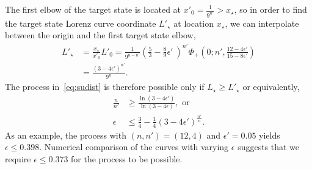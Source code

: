 \documentclass[pra,
aps,
twocolumn,
superscriptaddress,
groupedaddress,
nofootinbib,
reprint
]{revtex4-1}
\begin{document}
The first elbow of the target state is located at $x'_0 = \frac{1}{9^{n'}} > x_\star$, so in order to find the target state Lorenz curve coordinate $L'_\star$ at location $x_\star$, we can interpolate between the origin and the first target state elbow, 
\begin{equation}\label{eq:constraint_deriv}
	\begin{split}
	L'_\star &= \frac{x_\star}{x'_0}L'_0 = \frac{1}{9^{n-n'}}\left( \frac{5}{3} - \frac{8}{9}\epsilon'\ \right)^{n'}\Phi_+\left(0;n',\frac{12-4\epsilon'}{15-8\epsilon'}\right) \\
	&= \frac{(3-4\epsilon')^{n'}}{9^{n}}.
	\end{split}
\end{equation}
The process in~\cref{eq:sudist} is therefore possible only if $L_\star \geq L'_\star$ or equivalently,
\begin{align}
	\frac{n}{n'} &\geq \frac{\ln{(3-4\epsilon')}}{\ln{(3-4\epsilon)}}, \text{ or}\\
	\epsilon &\leq \frac{3}{4} - \frac{1}{4}(3-4\epsilon')^{\frac{n'}{n}}.
\end{align}
As an example, the process with $(n, n') = (12, 4)$ and $\epsilon' = 0.05$ yields $\epsilon \leq 0.398$.
Numerical comparison of the curves with varying $\epsilon$ suggests that we require $\epsilon \leq 0.373$ for the process to be possible.
\end{document}
